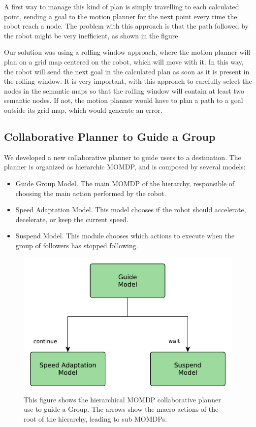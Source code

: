 A first way to manage this kind of plan is simply travelling to each calculated point, sending a goal to the motion planner for the next point every time the robot reach a node. The problem with this approach is that the path followed by the robot might be very inefficient, as shown in the figure %

Our solution was using a rolling window approach, where the motion planner will plan on a grid map centered on the robot, which will move with it. In this way, the robot will send the next goal in the calculated plan as soon as it is present in the rolling window. It is very important, with this approach to carefully select the nodes in the semantic maps so that the rolling window will contain at least two semantic nodes. If not, the motion planner would have to plan a path to a goal outside its grid map, which would generate an error.



\subsection{Collaborative Planner to Guide a Group}
We developed a new collaborative planner to guide users to a destination. The planner is organized as hierarchic MOMDP, and is composed by several models:
\begin{itemize}
\item Guide Group Model. The main MOMDP of the hierarchy, responsible of choosing the main action performed by the robot.
\item Speed Adaptation Model. This model chooses if the robot should accelerate, decelerate, or keep the current speed.
\item Suspend Model. This module chooses which actions to execute when the group of followers has stopped following.
\end{itemize}


\begin{figure}[ht!]
	\centering
	\includegraphics[scale=0.45]{img/case_study/spencer/guide_planner.pdf}
	\caption{This figure shows the hierarchical MOMDP collaborative planner use to guide a Group. The arrows show the macro-actions of the root of the hierarchy, leading to sub MOMDPs.}
	\label{fig:case_study-spencer-team}
\end{figure}


